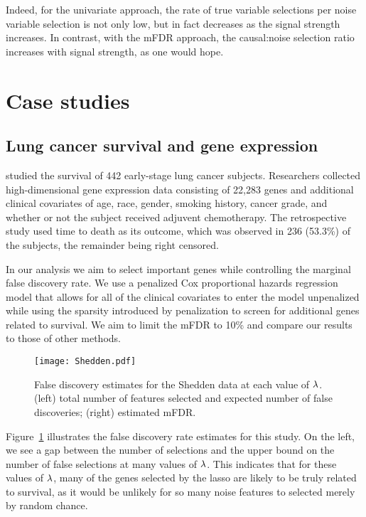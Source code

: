 Indeed, for the univariate approach, the rate of true variable selections per noise variable selection is not only low, but in fact decreases as the signal strength increases. In contrast, with the mFDR approach, the causal:noise selection ratio increases with signal strength, as one would hope.

\section{Case studies}

\subsection{Lung cancer survival and gene expression}

\citet{Shedden2008} studied the survival of 442 early-stage lung cancer subjects. Researchers collected high-dimensional gene expression data consisting of 22,283 genes and additional clinical covariates of age, race, gender, smoking history, cancer grade, and whether or not the subject received adjuvent chemotherapy.  The retrospective study used time to death as its outcome, which was observed in 236 (53.3\%) of the subjects, the remainder being right censored.

In our analysis we aim to select important genes while controlling the marginal false discovery rate.  We use a penalized Cox proportional hazards regression model that allows for all of the clinical covariates to enter the model unpenalized while using the sparsity introduced by penalization to screen for additional genes related to survival.  We aim to limit the mFDR to 10\% and compare our results to those of other methods.

\begin{figure} [!htb]
 \centering
  \texttt{[image: Shedden.pdf]}
  \caption{\label{Fig:Shedden} False discovery estimates for the Shedden data at each value of $\lambda$.  (left) total number of features selected and expected number of false discoveries; (right) estimated mFDR.}
\end{figure}

Figure~\ref{Fig:Shedden} illustrates the false discovery rate estimates for this study.  On the left, we see a gap between the number of selections and the upper bound on the number of false selections at many values of $\lambda$.  This indicates that for these values of $\lambda$, many of the genes selected by the lasso are likely to be truly related to survival, as it would be unlikely for so many noise features to selected merely by random chance.

